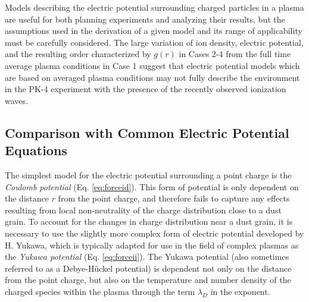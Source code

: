 \documentclass[aip,amsmath,amssymb,graphicx,floatfix,reprint]{revtex4-1}
\begin{document}
Models describing the electric potential surrounding charged particles in a plasma are useful for both planning experiments and analyzing their results, but the assumptions used in the derivation of a given model and its range of applicability must be carefully considered.  The large variation of ion density, electric potential, and the resulting order characterized by $g(r)$ in Cases 2-4 from the full time average plasma conditions in Case 1 suggest that electric potential models which are based on averaged plasma conditions may not fully describe the environment in the PK-4 experiment with the presence of the recently observed ionization waves.

\subsection{Comparison with Common Electric Potential Equations}
\label{potcomps}
The simplest model for the electric potential surrounding a point charge is the \emph{Coulomb potential} (Eq. \ref{eq:forceid}).  This form of potential is only dependent on the distance $r$ from the point charge, and therefore fails to capture any effects resulting from local non-neutrality of the charge distribution close to a dust grain.  To account for the changes in charge distribution near a dust grain, it is necessary to use the slightly more complex form of electric potential developed by H. Yukawa\cite{Yukawa1934}, which is typically adapted for use in the field of complex plasmas as the \emph{Yukawa potential} (Eq. \ref{eq:forceii}).  The Yukawa potential (also sometimes referred to as a Debye-H\"{u}ckel potential) is dependent not only on the distance from the point charge, but also on the temperature and number density of the charged species within the plasma through the term $\lambda_D$ in the exponent.  
\end{document}
